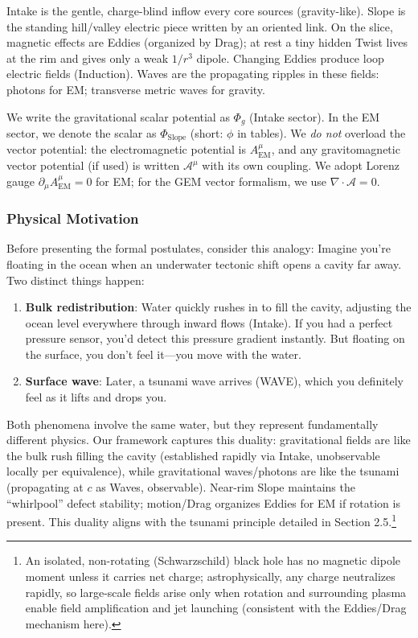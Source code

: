 Intake is the gentle, charge-blind inflow every core sources (gravity-like). Slope is the standing hill/valley electric piece written by an oriented link. On the slice, magnetic effects are Eddies (organized by Drag); at rest a tiny hidden Twist lives at the rim and gives only a weak $1/r^3$ dipole. Changing Eddies produce loop electric fields (Induction). Waves are the propagating ripples in these fields: photons for EM; transverse metric waves for gravity.

We write the gravitational scalar potential as $\Phi_g$ (Intake sector). In the EM sector, we denote the scalar as $\Phi_{\text{Slope}}$ (short: $\phi$ in tables). We \emph{do not} overload the vector potential: the electromagnetic potential is $A^\mu_{\text{EM}}$, and any gravitomagnetic vector potential (if used) is written $\mathcal A^\mu$ with its own coupling. We adopt Lorenz gauge $\partial_\mu A^\mu_{\text{EM}}=0$ for EM; for the GEM vector formalism, we use $\nabla\!\cdot\!\boldsymbol{\mathcal A}=0$.

\subsubsection{Physical Motivation}

Before presenting the formal postulates, consider this analogy: Imagine you're floating in the ocean when an underwater tectonic shift opens a cavity far away. Two distinct things happen:

\begin{enumerate}
\item \textbf{Bulk redistribution}: Water quickly rushes in to fill the cavity, adjusting the ocean level everywhere through inward flows (Intake). If you had a perfect pressure sensor, you'd detect this pressure gradient instantly. But floating on the surface, you don't feel it---you move with the water.
\item \textbf{Surface wave}: Later, a tsunami wave arrives (WAVE), which you definitely feel as it lifts and drops you.
\end{enumerate}

Both phenomena involve the same water, but they represent fundamentally different physics. Our framework captures this duality: gravitational fields are like the bulk rush filling the cavity (established rapidly via Intake, unobservable locally per equivalence), while gravitational waves/photons are like the tsunami (propagating at $c$ as Waves, observable). Near-rim Slope maintains the ``whirlpool'' defect stability; motion/Drag organizes Eddies for EM if rotation is present. This duality aligns with the tsunami principle detailed in Section 2.5.\footnote{An isolated, non-rotating (Schwarzschild) black hole has no magnetic dipole moment unless it carries net charge; astrophysically, any charge neutralizes rapidly, so large-scale fields arise only when rotation and surrounding plasma enable field amplification and jet launching (consistent with the Eddies/Drag mechanism here).}

